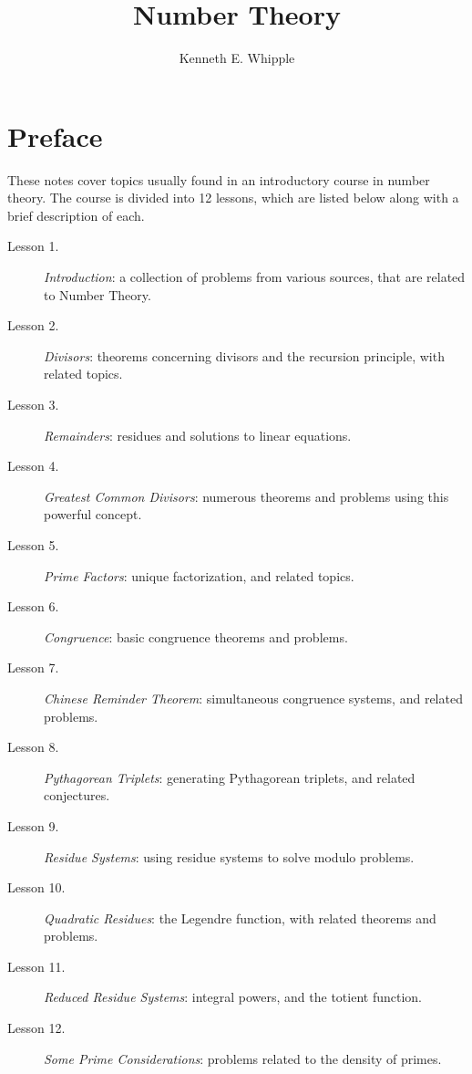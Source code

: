 \documentclass{article}
\let\titlepageAuthor\author
\renewcommand{\author}[1]{\newcommand{\headerAuthor}{#1}\titlepageAuthor{#1}}
\let\titlepageTitle\title
\renewcommand{\title}[1]{\newcommand{\headerTitle}{#1}\titlepageTitle{#1}}
\begin{document}
\title{Number Theory}
\author{Kenneth E. Whipple}
\date{}
\maketitle
\thispagestyle{empty}



\newpage

\setcounter{tocdepth}{3} 
\tableofcontents
\thispagestyle{empty}


\newpage

\section*{Preface}


These notes cover topics usually found in an introductory course in number theory. The course is divided into 12 lessons, which are listed below along with a brief description of each.

\begin{description}
  \item[Lesson 1.] \emph{Introduction}: a collection of problems from various sources, that are related to Number Theory.
  \item[Lesson 2.] \emph{Divisors}: theorems concerning divisors and the recursion principle, with related topics.
  \item[Lesson 3.] \emph{Remainders}: residues and solutions to linear equations.
  \item[Lesson 4.] \emph{Greatest Common Divisors}: numerous theorems and problems using this powerful concept.
  \item[Lesson 5.] \emph{Prime Factors}: unique factorization, and related topics.
  \item[Lesson 6.] \emph{Congruence}: basic congruence theorems and problems.
  \item[Lesson 7.] \emph{Chinese Reminder Theorem}: simultaneous congruence systems, and related problems.
  \item[Lesson 8.] \emph{Pythagorean Triplets}: generating Pythagorean triplets, and related conjectures.
  \item[Lesson 9.] \emph{Residue Systems}: using residue systems to solve modulo problems.
  \item[Lesson 10.] \emph{Quadratic Residues}: the Legendre function, with related theorems and problems.
  \item[Lesson 11.] \emph{Reduced Residue Systems}: integral powers, and the totient function.
  \item[Lesson 12.] \emph{Some Prime Considerations}: problems related to the density of primes.
\end{description}
\end{document}
